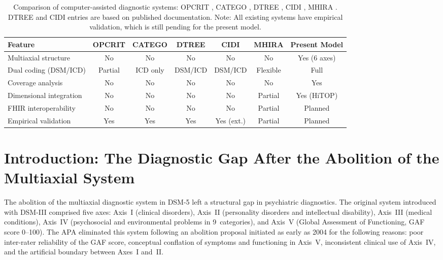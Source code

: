 \documentclass[11pt,a4paper]{article}
\begin{document}
\begin{table}[ht]
\centering
\caption{Comparison of computer-assisted diagnostic systems: OPCRIT \citep{McGuffin1991}, CATEGO \citep{Wing1974}, DTREE \citep{First1993}, CIDI \citep{Kessler2004}, MHIRA \citep{Stasiak2023}. DTREE and CIDI entries are based on published documentation. Note: All existing systems have empirical validation, which is still pending for the present model.}
\begin{tabular}{lcccccc}
\toprule
Feature & OPCRIT & CATEGO & DTREE & CIDI & MHIRA & Present Model \\
\midrule
Multiaxial structure & No & No & No & No & No & Yes (6 axes) \\
Dual coding (DSM/ICD) & Partial & ICD only & DSM/ICD & DSM/ICD & Flexible & Full \\
Coverage analysis & No & No & No & No & No & Yes \\
Dimensional integration & No & No & No & No & Partial & Yes (HiTOP) \\
FHIR interoperability & No & No & No & No & Partial & Planned \\
Empirical validation & Yes & Yes & Yes & Yes (ext.) & Partial & Planned \\
\bottomrule
\end{tabular}
\label{tab:comparison}
\end{table}

\newpage


\section{Introduction: The Diagnostic Gap After the Abolition of the Multiaxial System}
\label{sec:introduction}

The abolition of the multiaxial diagnostic system in DSM-5 \citep{APA2013} left a structural gap in psychiatric diagnostics. The original system introduced with DSM-III \citep{APA1980DSM3} comprised five axes: Axis~I (clinical disorders), Axis~II (personality disorders and intellectual disability), Axis~III (medical conditions), Axis~IV (psychosocial and environmental problems in 9~categories), and Axis~V (Global Assessment of Functioning, GAF score 0--100). The APA eliminated this system following an abolition proposal initiated as early as 2004 for the following reasons: poor inter-rater reliability of the GAF score, conceptual conflation of symptoms and functioning in Axis~V, inconsistent clinical use of Axis~IV, and the artificial boundary between Axes~I and~II.
\end{document}
